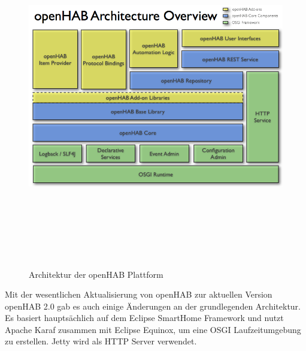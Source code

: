     \begin{figure}[hbt!]
        \centering
        \includegraphics[width=15cm,height=15cm,keepaspectratio]{images/openhab-architecture.png}
        \caption{Architektur der openHAB Plattform \cite{openHAB-architecture2018}}
        \label{fig:architectureopenHAB}
    \end{figure}
    Mit der wesentlichen Aktualisierung von openHAB zur aktuellen Version openHAB 2.0 gab es auch einige Änderungen an der 
    grundlegenden Architektur. Es basiert hauptsächlich auf dem Eclipse SmartHome Framework und nutzt Apache Karaf zusammen mit 
    Eclipse Equinox, um eine \acs{OSGI} Laufzeitumgebung zu erstellen. Jetty wird als \acs{HTTP} Server verwendet. 
